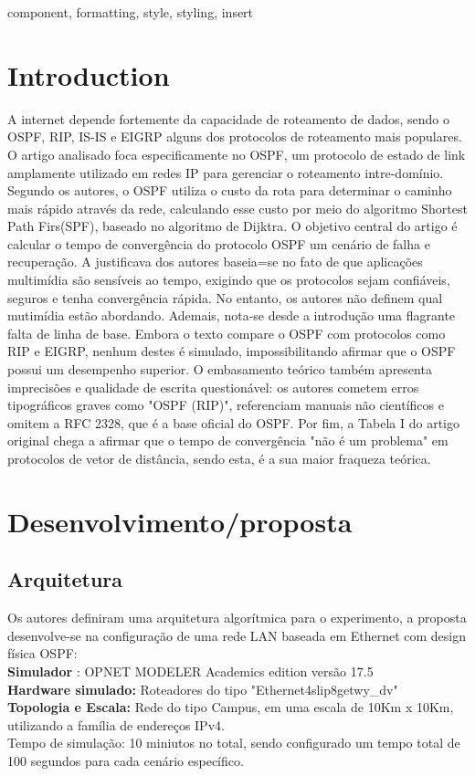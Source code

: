 \documentclass[conference]{IEEEtran}
\begin{document}
\begin{IEEEkeywords}
component, formatting, style, styling, insert
\end{IEEEkeywords}

\section{Introduction}
A internet depende fortemente da capacidade de roteamento de dados, sendo o OSPF, RIP, IS-IS e EIGRP alguns dos protocolos de roteamento mais populares. O artigo analisado foca especificamente no OSPF, um protocolo de estado de link amplamente utilizado em redes IP para gerenciar o roteamento intre-domínio. Segundo os autores, o OSPF utiliza o custo da rota para determinar o caminho mais rápido através da rede, calculando esse custo por meio do algoritmo Shortest Path Firs(SPF), baseado no algoritmo de Dijktra. O objetivo central do artigo é calcular o tempo de convergência do protocolo OSPF um cenário de falha e recuperação. A justificava dos autores baseia=se no fato de que aplicações multimídia são sensíveis ao tempo, exigindo que os protocolos sejam confiáveis, seguros e tenha convergência rápida. No entanto, os autores não definem qual mutimídia estão abordando. Ademais, nota-se desde a introdução uma flagrante falta de linha de base. Embora o texto compare o OSPF com protocolos como RIP e EIGRP, nenhum destes é simulado, impossibilitando afirmar que o OSPF possui um desempenho superior. O embasamento teórico também apresenta imprecisões e qualidade de escrita questionável: os autores cometem erros tipográficos graves como "OSPF (RIP)", referenciam manuais não científicos e omitem a RFC 2328, que é a base oficial do OSPF. Por fim, a Tabela I do artigo original chega a afirmar que o tempo de convergência "não é um problema" em protocolos de vetor de distância, sendo esta, é a sua maior fraqueza teórica.

\section{Desenvolvimento/proposta}

\subsection{Arquitetura}
Os autores definiram uma arquitetura algorítmica para o experimento, a proposta desenvolve-se na configuração de uma rede LAN baseada em Ethernet com design física OSPF:\\
\textbf{Simulador} : OPNET MODELER Academics edition versão 17.5\\
\textbf{Hardware simulado: }Roteadores do tipo "Ethernet4slip8getwy_dv"\\
\textbf{Topologia e Escala:} Rede do tipo Campus, em uma escala de 10Km x 10Km, utilizando a família de endereços IPv4.\\
Tempo de simulação: 10 miniutos no total, sendo configurado um tempo total de 100 segundos para cada cenário específico.\\
\end{document}
